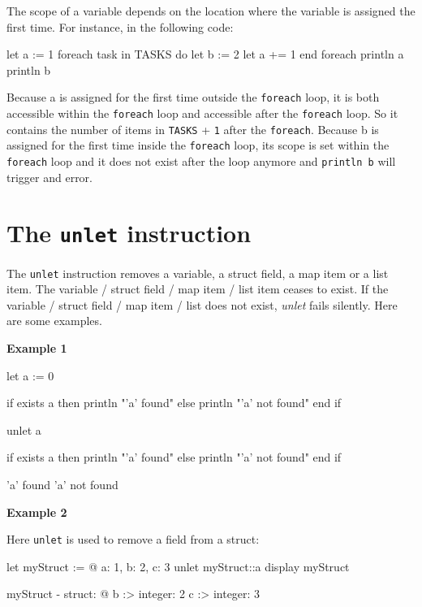 \documentclass[10pt,openright,twosides]{report}
\newcommand{\gtlinline}[1]{\colorbox{light-blue}{\lstinline[language=gtl]{#1}}}
\newcommand{\examplen}[1]{\vspace{.75em}\noindent\textbf{Example #1}\vspace{0em}}
\begin{document}
The scope of a variable depends on the location where the variable is assigned the first time. For instance, in the following code:

\begin{gtl}
let a := 1
foreach task in TASKS do
  let b := 2
  let a += 1
end foreach
println a
println b
\end{gtl}

Because a is assigned for the first time outside the \gtlinline{foreach} loop, it is both accessible within the \gtlinline{foreach} loop and accessible after the \gtlinline{foreach} loop. So it contains the number of items in \gtlinline{TASKS} + \gtlinline{1} after the \gtlinline{foreach}. Because b is assigned for the first time inside the \gtlinline{foreach} loop, its scope is set within the \gtlinline{foreach} loop and it does not exist after the loop anymore and \gtlinline{println b} will trigger and error.


\section{The \texttt{unlet} instruction}

The \gtlinline{unlet} instruction removes a variable, a struct field, a map item or a list item. The variable / struct field / map item / list item ceases to exist. If the variable / struct field / map item / list does not exist, {\em unlet} fails silently. Here are some examples.

\examplen{1}
\begin{gtl}
let a := 0

if exists a then
  println "'a' found"
else
  println "'a' not found"
end if

unlet a

if exists a then
  println "'a' found"
else
  println "'a' not found"
end if
\end{gtl}

\begin{console}
'a' found
'a' not found
\end{console}


\examplen{2}

\noindent Here \gtlinline{unlet} is used to remove a field from a struct:

\begin{gtl}
let myStruct := @{ a: 1, b: 2, c: 3 }
unlet myStruct::a
display myStruct
\end{gtl} 

\begin{console}
myStruct - struct: @{
    b :>
        integer: 2
    c :>
        integer: 3
}
\end{console}
\end{document}
